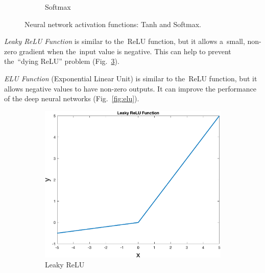 \begin{figure}[!ht]
\begin{subfigure}[b]{0.3\textwidth}
            \caption{Softmax}
            \label{fig:sigmsoftmaxoid}
        \end{subfigure}
             \caption{Neural network activation functions: Tanh and Softmax.}
        \label{fig:activationfunctions}
    \end{figure}

\emph{Leaky ReLU Function} is similar to the~ReLU function, but it allows a~small, non-zero gradient when the~input value is negative. This can help to prevent the~``dying ReLU'' problem (Fig.~\ref{fig:leakyrelu}).

\emph{ELU Function} (Exponential Linear Unit) is similar to the~ReLU function, but it allows negative values to have non-zero outputs. It can improve the performance of the deep neural networks (Fig.~\ref{fig:elu}).
%
    \begin{figure}[!ht]
        \centering
        \begin{subfigure}[b]{0.3\textwidth}
            \includegraphics[width=\textwidth]{figures/leakyrelu}
            \caption{Leaky ReLU}
            \label{fig:leakyrelu}
        \end{subfigure}
        \hspace{0.1\textwidth}
        \begin{subfigure}[b]{0.3\textwidth}

\end{subfigure}
\end{figure}
